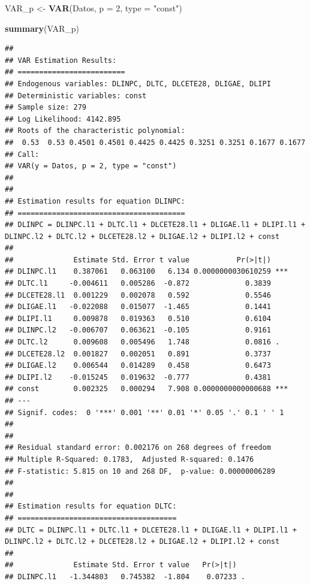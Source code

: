 \documentclass[
]{book}
\newenvironment{Shaded}{\begin{snugshade}}{\end{snugshade}}
\newcommand{\AttributeTok}[1]{\textcolor[rgb]{0.13,0.29,0.53}{#1}}
\newcommand{\DecValTok}[1]{\textcolor[rgb]{0.00,0.00,0.81}{#1}}
\newcommand{\FunctionTok}[1]{\textcolor[rgb]{0.13,0.29,0.53}{\textbf{#1}}}
\newcommand{\NormalTok}[1]{#1}
\newcommand{\OtherTok}[1]{\textcolor[rgb]{0.56,0.35,0.01}{#1}}
\newcommand{\StringTok}[1]{\textcolor[rgb]{0.31,0.60,0.02}{#1}}
\begin{document}
\begin{Shaded}
\begin{Highlighting}[]
\NormalTok{VAR\_p }\OtherTok{\textless{}{-}} \FunctionTok{VAR}\NormalTok{(Datos, }\AttributeTok{p =} \DecValTok{2}\NormalTok{, }\AttributeTok{type =} \StringTok{"const"}\NormalTok{)}

\FunctionTok{summary}\NormalTok{(VAR\_p)}
\end{Highlighting}
\end{Shaded}

\begin{verbatim}
## 
## VAR Estimation Results:
## ========================= 
## Endogenous variables: DLINPC, DLTC, DLCETE28, DLIGAE, DLIPI 
## Deterministic variables: const 
## Sample size: 279 
## Log Likelihood: 4142.895 
## Roots of the characteristic polynomial:
##  0.53  0.53 0.4501 0.4501 0.4425 0.4425 0.3251 0.3251 0.1677 0.1677
## Call:
## VAR(y = Datos, p = 2, type = "const")
## 
## 
## Estimation results for equation DLINPC: 
## ======================================= 
## DLINPC = DLINPC.l1 + DLTC.l1 + DLCETE28.l1 + DLIGAE.l1 + DLIPI.l1 + DLINPC.l2 + DLTC.l2 + DLCETE28.l2 + DLIGAE.l2 + DLIPI.l2 + const 
## 
##              Estimate Std. Error t value           Pr(>|t|)    
## DLINPC.l1    0.387061   0.063100   6.134 0.0000000030610259 ***
## DLTC.l1     -0.004611   0.005286  -0.872             0.3839    
## DLCETE28.l1  0.001229   0.002078   0.592             0.5546    
## DLIGAE.l1   -0.022088   0.015077  -1.465             0.1441    
## DLIPI.l1     0.009878   0.019363   0.510             0.6104    
## DLINPC.l2   -0.006707   0.063621  -0.105             0.9161    
## DLTC.l2      0.009608   0.005496   1.748             0.0816 .  
## DLCETE28.l2  0.001827   0.002051   0.891             0.3737    
## DLIGAE.l2    0.006544   0.014289   0.458             0.6473    
## DLIPI.l2    -0.015245   0.019632  -0.777             0.4381    
## const        0.002325   0.000294   7.908 0.0000000000000688 ***
## ---
## Signif. codes:  0 '***' 0.001 '**' 0.01 '*' 0.05 '.' 0.1 ' ' 1
## 
## 
## Residual standard error: 0.002176 on 268 degrees of freedom
## Multiple R-Squared: 0.1783,  Adjusted R-squared: 0.1476 
## F-statistic: 5.815 on 10 and 268 DF,  p-value: 0.00000006289 
## 
## 
## Estimation results for equation DLTC: 
## ===================================== 
## DLTC = DLINPC.l1 + DLTC.l1 + DLCETE28.l1 + DLIGAE.l1 + DLIPI.l1 + DLINPC.l2 + DLTC.l2 + DLCETE28.l2 + DLIGAE.l2 + DLIPI.l2 + const 
## 
##              Estimate Std. Error t value   Pr(>|t|)    
## DLINPC.l1   -1.344803   0.745382  -1.804    0.07233 .  

\end{verbatim}
\end{document}
